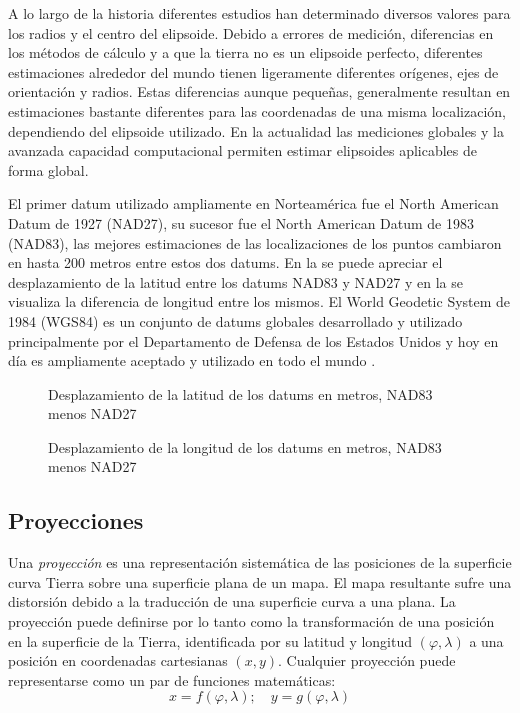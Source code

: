 A lo largo de la historia diferentes estudios han determinado diversos valores para los radios y el centro del elipsoide. Debido a errores de medición, diferencias en los métodos de cálculo y a que la tierra no es un elipsoide perfecto, diferentes estimaciones alrededor del mundo tienen ligeramente diferentes orígenes, ejes de orientación y radios. Estas diferencias aunque pequeñas, generalmente resultan en estimaciones bastante diferentes para las coordenadas de una misma localización, dependiendo del elipsoide utilizado. En la actualidad las mediciones globales y la avanzada capacidad computacional permiten estimar elipsoides aplicables de forma global.

El primer datum utilizado ampliamente en Norteamérica fue el North American Datum de 1927 (NAD27), su sucesor fue el North American Datum de 1983 (NAD83), las mejores estimaciones de las localizaciones de los puntos cambiaron en hasta 200 metros entre estos dos datums. En la  se puede apreciar el desplazamiento de la latitud entre los datums NAD83 y NAD27 y en la  se visualiza la diferencia de longitud entre los mismos. El World Geodetic System de 1984 (WGS84) es un conjunto de datums globales desarrollado y utilizado principalmente por el Departamento de Defensa de los Estados Unidos y hoy en día es ampliamente aceptado y utilizado en todo el mundo \cite{longley2005geographic}.

\begin{figure}[h]
	\centering
	
	\caption[Desplazamiento de la latitud entre NAD83 y NAD27]{Desplazamiento de la latitud de los datums en metros, NAD83 menos NAD27}
	\label{fig:datum-latitud} 
\end{figure}

\begin{figure}[h]
	\centering
	
	\caption[Desplazamiento de la longitud entre NAD83 y NAD27]{Desplazamiento de la longitud de los datums en metros, NAD83 menos NAD27}
	\label{fig:datum-longitud} 
\end{figure}

\subsection{Proyecciones}

Una \emph{proyección} es una representación sistemática de las posiciones de la superficie curva Tierra sobre una superficie plana de un mapa. El mapa resultante sufre una distorsión debido a la traducción de una superficie curva a una plana. La proyección puede definirse por lo tanto como la transformación de una posición en la superficie de la Tierra, identificada por su latitud y longitud $(\varphi,\lambda)$ a una posición en coordenadas cartesianas $(x,y)$. Cualquier proyección puede representarse como un par de funciones matemáticas: \begin{displaymath} x=f(\varphi,\lambda );\quad y=g(\varphi,\lambda ) \end{displaymath}

